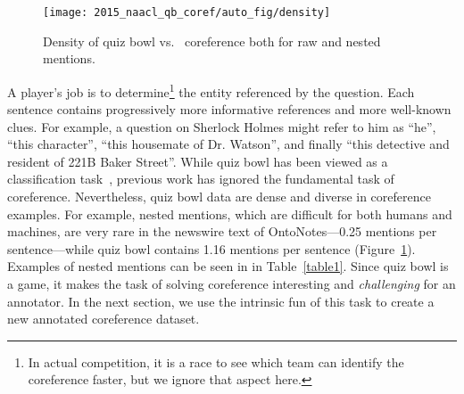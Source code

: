 \begin{figure}[t]
\begin{center}
\texttt{[image: 2015\_naacl\_qb\_coref/auto\_fig/density]}
\end{center}
   \caption{Density of quiz bowl vs.\ \conll{} coreference both for raw and nested mentions.}
\label{fig:dense}
\end{figure}

A player's job is to
determine\footnote{In actual competition, it is a race to see which
  team can identify the coreference faster, but we ignore that aspect
  here.} the entity referenced by the question.  Each sentence contains
progressively more informative references and more well-known clues.  For
example, a question on Sherlock Holmes might refer to him as ``he'',
``this character'', ``this housemate of Dr. Watson'', and finally
``this detective and resident of 221B Baker Street''. While quiz bowl has been viewed as a classification
task~\cite{IyyerQA2014}, previous work has ignored the
fundamental task of coreference.  Nevertheless, quiz bowl data are dense and
diverse in coreference examples. For example, nested mentions, which are
difficult for both humans and machines, are very rare in the newswire text of
OntoNotes---0.25 mentions per sentence---while quiz bowl contains 1.16 mentions
per sentence (Figure~\ref{fig:dense}). Examples of nested mentions can be seen in
in Table~\ref{table1}. Since quiz bowl is a game, it makes the task of solving coreference interesting
and \emph{challenging} for an annotator. In the next section, we use the
intrinsic fun of this task to create a new annotated coreference dataset.

